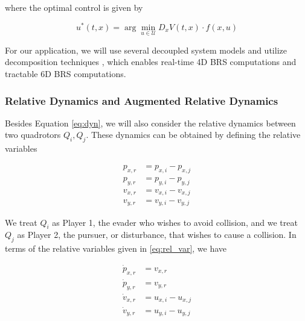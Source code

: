 \noindent where the optimal control is given by

\begin{equation} \label{eq:HJB_ctrl_syn}
u^*(t,x) = \arg \min_{u\in\mathcal{U}} D_x V(t,x) \cdot f(x,u)
\end{equation}

For our application, we will use several decoupled system models and utilize decomposition techniques \cite{Chen15, Chen17b, Chen2016a}, which enables real-time 4D BRS computations and tractable 6D BRS computations.

\subsubsection{Relative Dynamics and Augmented Relative Dynamics}
Besides Equation \eqref{eq:dyn}, we will also consider the relative dynamics between two quadrotors $Q_i,Q_j$. These dynamics can be obtained by defining the relative variables

\begin{equation} \label{eq:rel_var}
\begin{aligned}
p_{x,r} &= p_{x,i} - p_{x,j} \\
p_{y,r} &= p_{y,i} - p_{y,j}\\
v_{x,r} &= v_{x,i} - v_{x,j}\\
v_{y,r} &= v_{y,i} - v_{y,j}
\end{aligned}
\end{equation}

We treat $Q_i$ as Player 1, the evader who wishes to avoid collision, and we treat $Q_j$ as Player 2, the pursuer, or disturbance, that wishes to cause a collision. In terms of the relative variables given in \eqref{eq:rel_var}, we have 

\begin{equation} \label{eq:rel_dyn}
\begin{aligned}
\dot{p}_{x,r} &= v_{x,r} \\
\dot{p}_{y,r} &= v_{y,r} \\
\dot{v}_{x,r} &= u_{x,i} - u_{x,j} \\
\dot{v}_{y,r} &= u_{y,i} - u_{y,j}
\end{aligned}
\end{equation}


